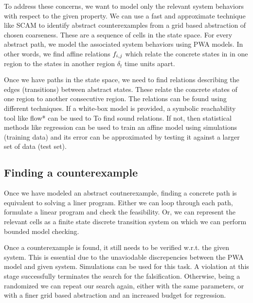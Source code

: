 To address these concerns, we want to model only the relevant system
behaviors with respect to the given property. We can use a fast and
approximate technique like SCAM to identify abstract counterexamples
from a grid based abstraction of chosen coarseness. These are a
sequence of cells in the state space. For every abstract path, we
model the associated system behaviors using PWA models. In other
words, we find affine relations $f_{i,j}$ which relate the concrete
states in in one region to the states in another region $\delta_t$
time units apart.

Once we have paths in the state space, we need to find relations
describing the edges (transitions) between abstract states. These
relate the concrete states of one region to another consecutive
region. The relations can be found using different techniques. If a
white-box model is provided, a symbolic reachability tool like flow*
can be used to To find sound relations. If not, then statistical
methods like regression can be used to train an affine model using
simulations (training data) and its error can be approximated by
testing it against a larger set of data (test set).


\subsection{Finding a counterexample} Once we have modeled an abstract
coutnerexample, finding a concrete path is equivalent to solving a
liner program. Either we can loop through each path, formulate a
linear program and check the feasibility. Or, we can represent the
relevant cells as a finite state discrete transition system on which
we can perform bounded model checking.

Once a counterexample is found, it still needs to be verified w.r.t.
the given system. This is essential due to the unaviodable
discrepencies between the PWA model and given system. Simulations can
be used for this task. A violation at this stage successfully
terminates the search for the falsification. Otherwise, being a
randomized we can repeat our search again, either with the same
parameters, or with a finer grid based abstraction and an increased
budget for regression.
